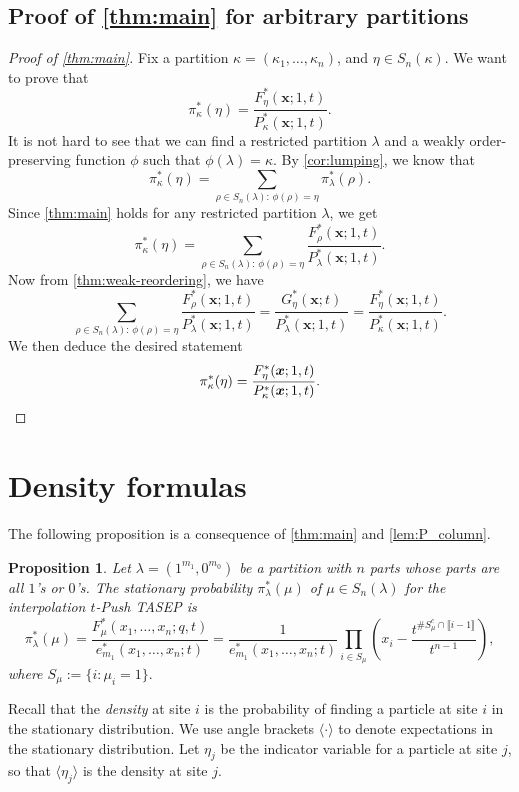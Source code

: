 \documentclass[12pt]{amsart}
\newtheorem{prop}[thm]{Proposition}
\theoremstyle{definition}
\newcommand{\bfx}{\boldsymbol{x}}
\begin{document}
\subsection{Proof of \texorpdfstring{\cref{thm:main}}{the main theorem} for arbitrary partitions}\label{sec:arbitrary}
\begin{proof}[Proof of \cref{thm:main}]
Fix a partition $\kappa=(\kappa_1,\dots,\kappa_n)$, and $\eta\in S_n(\kappa)$.  We want to prove that 
$$\pi_\kappa^*(\eta)=\frac{F^*_\eta(\bfx;1,t)}{P^*_\kappa(\bfx;1,t)}.$$
It is not hard to see that we can find 
a restricted partition $\lambda$ and a weakly order-preserving function $\phi$ such that $\phi(\lambda)=\kappa$.
By \cref{cor:lumping}, we know that
        $$\pi^*_\kappa(\eta)=\sum_{\rho\in S_n(\lambda):\, \phi(\rho)=\eta}\pi^*_{\lambda}(\rho).$$
Since \cref{thm:main} holds for any restricted partition $\lambda$, we get
$$\pi^*_\kappa(\eta)=\sum_{\rho\in S_n(\lambda):\, \phi(\rho)=\eta}\frac{F^*_\rho(\bfx;1,t)}{P^*_\lambda(\bfx;1,t)}.$$
Now from \cref{thm:weak-reordering}, we have
$$\sum_{\rho\in S_n(\lambda):\, \phi(\rho)=\eta}\frac{F^*_{\rho}(\bfx;1,t)}{P^*_\lambda(\bfx;1,t)}
=\frac{G^*_{\eta}(\bfx;t)}{P^*_\lambda(\bfx;1,t)}
=\frac{F^*_\eta(\bfx;1,t)}{P^*_\kappa(\bfx;1,t)}.$$
We then deduce the desired statement
\begin{equation*}
  \pi^*_\kappa(\eta)=\frac{F^*_\eta(\bfx;1,t)}{P^*_\kappa(\bfx;1,t)}.\qedhere  
\end{equation*}
\end{proof}

\section{Density formulas}\label{sec:density}

The following proposition is a consequence of
\cref{thm:main} and  \cref{lem:P_column}.
\begin{prop}\label{prop:01}
Let $\lambda = (1^{m_1}, 0^{m_0})$ be a partition with $n$ parts whose parts are all $1$'s or $0$'s.  The stationary probability $\pi_\lambda^*(\mu)$ of $\mu \in S_n(\lambda)$ for the 
interpolation $t$-Push TASEP is 
$$\pi^*_\lambda(\mu) = 
\frac{F_{\mu}^*(x_1,\dots,x_n; q, t)}{e^*_{m_1}(x_1,\dots,x_n;t)} =
\frac{1}{e^*_{m_1}(x_1,\dots,x_n;t)} \prod_{i\in S_\mu}\left(x_i-\frac{t^{\#S^c_\mu\cap \llbracket i-1\rrbracket}}{t^{n-1}}\right), $$
    where $S_{\mu}:=\{i: \mu_i=1\}.$
\end{prop}
Recall that the \emph{density} at site $i$ is the probability of finding a particle at site $i$ in the stationary distribution.
We  use angle brackets 
$\langle \cdot \rangle$ to denote expectations in the stationary distribution.  Let 
$\eta_j$ be the indicator variable for a particle at site $j$, so that 
$\langle \eta_j\rangle$ is the density at site $j$.  
\end{document}

